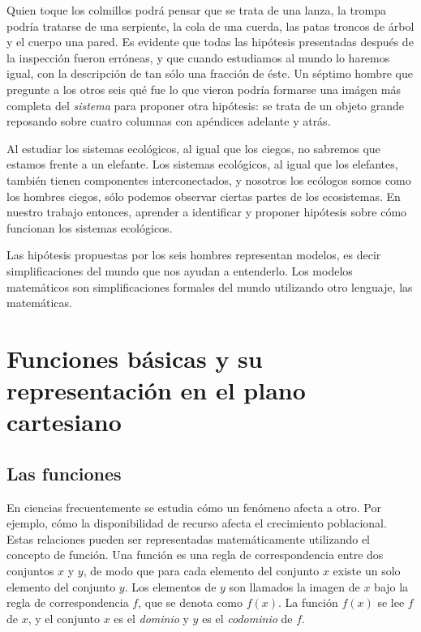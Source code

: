 \documentclass[
]{book}
\begin{document}
Quien toque los colmillos podrá pensar que se trata de una lanza, la trompa podría tratarse de una serpiente, la cola de una cuerda, las patas troncos de árbol y el cuerpo una pared. Es evidente que todas las hipótesis presentadas después de la inspección fueron erróneas, y que cuando estudiamos al mundo lo haremos igual, con la descripción de tan sólo una fracción de éste. Un séptimo hombre que pregunte a los otros seis qué fue lo que vieron podría formarse una imágen más completa del \emph{sistema} para proponer otra hipótesis: se trata de un objeto grande reposando sobre cuatro columnas con apéndices adelante y atrás.

Al estudiar los sistemas ecológicos, al igual que los ciegos, no sabremos que estamos frente a un elefante. Los sistemas ecológicos, al igual que los elefantes, también tienen componentes interconectados, y nosotros los ecólogos somos como los hombres ciegos, sólo podemos observar ciertas partes de los ecosistemas. En nuestro trabajo entonces, aprender a identificar y proponer hipótesis sobre cómo funcionan los sistemas ecológicos.

Las hipótesis propuestas por los seis hombres representan modelos, es decir simplificaciones del mundo que nos ayudan a entenderlo. Los modelos matemáticos son simplificaciones formales del mundo utilizando otro lenguaje, las matemáticas.

\hypertarget{funciones-buxe1sicas-y-su-representaciuxf3n-en-el-plano-cartesiano}{%
\section{Funciones básicas y su representación en el plano cartesiano}\label{funciones-buxe1sicas-y-su-representaciuxf3n-en-el-plano-cartesiano}}

\hypertarget{las-funciones}{%
\subsection{Las funciones}\label{las-funciones}}

En ciencias frecuentemente se estudia cómo un fenómeno afecta a otro. Por ejemplo, cómo la disponibilidad de recurso afecta el crecimiento poblacional. Estas relaciones pueden ser representadas matemáticamente utilizando el concepto de función. Una función es una regla de correspondencia entre dos conjuntos \(x\) y \(y\), de modo que para cada elemento del conjunto \(x\) existe un solo elemento del conjunto \(y\). Los elementos de \(y\) son llamados la imagen de \(x\) bajo la regla de correspondencia \(f\), que se denota como \(f(x)\). La función \(f(x)\) se lee \(f\) de \(x\), y el conjunto \(x\) es el \emph{dominio} y \(y\) es el \emph{codominio} de \(f\).
\end{document}
